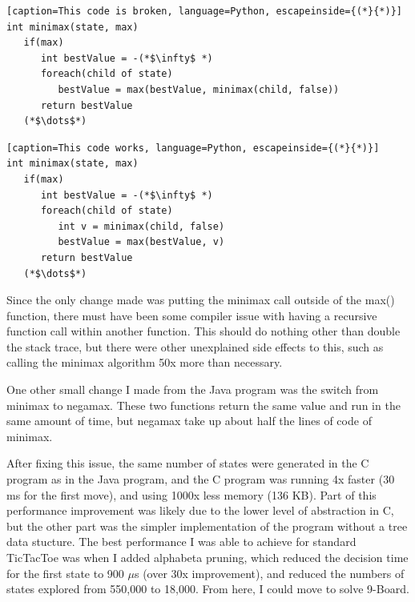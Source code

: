 \documentclass{article}
\begin{document}
\renewcommand{\lstlistingname}{Technique}
\begin{lstlisting}[caption=This code is broken, language=Python, escapeinside={(*}{*)}]
int minimax(state, max)
   if(max)
      int bestValue = -(*$\infty$ *)
      foreach(child of state)
         bestValue = max(bestValue, minimax(child, false))
      return bestValue
   (*$\dots$*)
\end{lstlisting}

\begin{lstlisting}[caption=This code works, language=Python, escapeinside={(*}{*)}]
int minimax(state, max)
   if(max)
      int bestValue = -(*$\infty$ *)
      foreach(child of state)
         int v = minimax(child, false)
         bestValue = max(bestValue, v)
      return bestValue
   (*$\dots$*)
\end{lstlisting}\vspace{5mm}

Since the only change made was putting the minimax call outside of the max() function, there must have been some compiler issue with having a recursive function call within another function. This should do nothing other than double the stack trace, but there were other unexplained side effects to this, such as calling the minimax algorithm 50x more than necessary.

One other small change I made from the Java program was the switch from minimax to negamax. These two functions return the same value and run in the same amount of time, but negamax take up about half the lines of code of minimax.

After fixing this issue, the same number of states were generated in the C program as in the Java program, and the C program was running 4x faster (30 ms for the first move), and using 1000x less memory (136 KB). Part of this performance improvement was likely due to the lower level of abstraction in C, but the other part was the simpler implementation of the program without a tree data stucture. The best performance I was able to achieve for standard TicTacToe was when I added alphabeta pruning, which reduced the decision time for the first state to 900 $\mu$s (over 30x improvement), and reduced the numbers of states explored from 550,000 to 18,000. From here, I could move to solve 9-Board.
\end{document}

